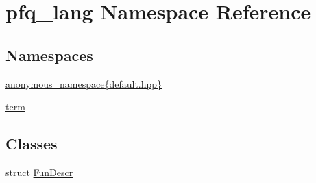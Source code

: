 \hypertarget{namespacepfq__lang}{\section{pfq\-\_\-lang Namespace Reference}
\label{namespacepfq__lang}
}
\subsection*{Namespaces}
\begin{DoxyCompactItemize}
\item 
\hyperlink{namespacepfq__lang_1_1anonymous__namespace_02default_8hpp_03}{anonymous\-\_\-namespace\{default.\-hpp\}}
\item 
\hyperlink{namespacepfq__lang_1_1term}{term}
\end{DoxyCompactItemize}
\subsection*{Classes}
\begin{DoxyCompactItemize}
\item 
struct \hyperlink{structpfq__lang_1_1FunDescr}{Fun\-Descr}
\end{DoxyCompactItemize}
